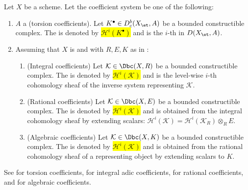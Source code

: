 \begin{definition} \label{definition:cohomology_sheaves_of_a_constructible_complex_for_various_coefficient_systems}
    Let $X$ be a scheme. Let the coefficient system be one of the following:
    \begin{enumerate}
        \item $A$ a   (torsion coefficients). Let $K^\bullet \in D_c^b(X_{\et}, A)$ be a bounded constructible complex. The  is denoted by \hl{$\mathscr{H}^i(K^\bullet)$} and is the $i$-th  in $D(X_{\et}, A)$.
        \item Assuming that $X$ is  and with $R, E, K$ as in :
        \begin{enumerate}
            \item (Integral coefficients) Let $\mathcal{K} \in \Dbc(X, R)$ be a bounded constructible complex. The  is denoted by \hl{$\mathscr{H}^i(\mathcal{K})$} and is the level-wise $i$-th cohomology sheaf of the inverse system representing $\mathcal{K}$.
            \item (Rational coefficients) Let $\mathcal{K} \in \Dbc(X, E)$ be a bounded constructible complex. The  is denoted by \hl{$\mathscr{H}^i(\mathcal{K})$} and is obtained from the integral cohomology sheaf by extending scalars: $\mathscr{H}^i(\mathcal{K}) = \mathscr{H}^i(\mathcal{K}_R) \otimes_R E$.
            \item (Algebraic coefficients) Let $\mathcal{K} \in \Dbc(X, K)$ be a bounded constructible complex. The  is denoted by \hl{$\mathscr{H}^i(\mathcal{K})$} and is obtained from the rational cohomology sheaf of a representing object by extending scalars to $K$.
        \end{enumerate}
    \end{enumerate}

    See  for torsion coefficients,  for integral adic coefficients,  for rational coefficients, and  for algebraic coefficients.
\end{definition}